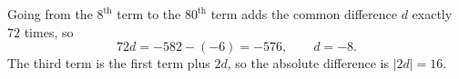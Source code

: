 Going from the $8^\text{th}$ term to the $80^\text{th}$ term adds the common difference $d$ exactly $72$ times, so
\[72d=-582-(-6)=-576,\qquad d=-8.\]
The third term is the first term plus $2d$, so the absolute difference is $|2d|=\boxed{16}$.
